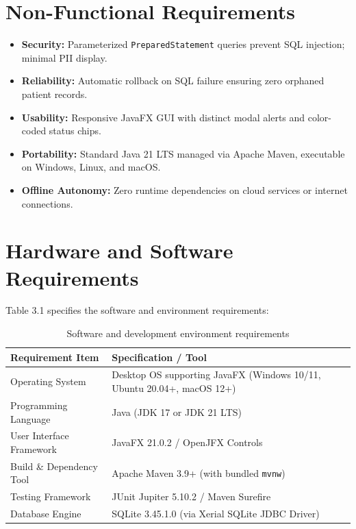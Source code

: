 \documentclass[12pt,a4paper,oneside]{report}
\begin{document}
\section{Non-Functional Requirements}
\begin{itemize}[leftmargin=0.8cm, itemsep=0.5pt]
    \item \textbf{Security:} Parameterized \texttt{PreparedStatement} queries prevent SQL injection; minimal PII display.
    \item \textbf{Reliability:} Automatic rollback on SQL failure ensuring zero orphaned patient records.
    \item \textbf{Usability:} Responsive JavaFX GUI with distinct modal alerts and color-coded status chips.
    \item \textbf{Portability:} Standard Java 21 LTS managed via Apache Maven, executable on Windows, Linux, and macOS.
    \item \textbf{Offline Autonomy:} Zero runtime dependencies on cloud services or internet connections.
\end{itemize}

\section{Hardware and Software Requirements}
Table 3.1 specifies the software and environment requirements:

\begin{table}[H]
\centering
\small
\begin{tabularx}{\textwidth}{p{4.2cm} X}
\toprule
\textbf{Requirement Item} & \textbf{Specification / Tool} \\
\midrule
Operating System & Desktop OS supporting JavaFX (Windows 10/11, Ubuntu 20.04+, macOS 12+) \\
Programming Language & Java (JDK 17 or JDK 21 LTS) \\
User Interface Framework & JavaFX 21.0.2 / OpenJFX Controls \\
Build \& Dependency Tool & Apache Maven 3.9+ (with bundled \texttt{mvnw}) \\
Testing Framework & JUnit Jupiter 5.10.2 / Maven Surefire \\
Database Engine & SQLite 3.45.1.0 (via Xerial SQLite JDBC Driver) \\
\bottomrule
\end{tabularx}
\caption{Software and development environment requirements}
\end{table}
\end{document}
